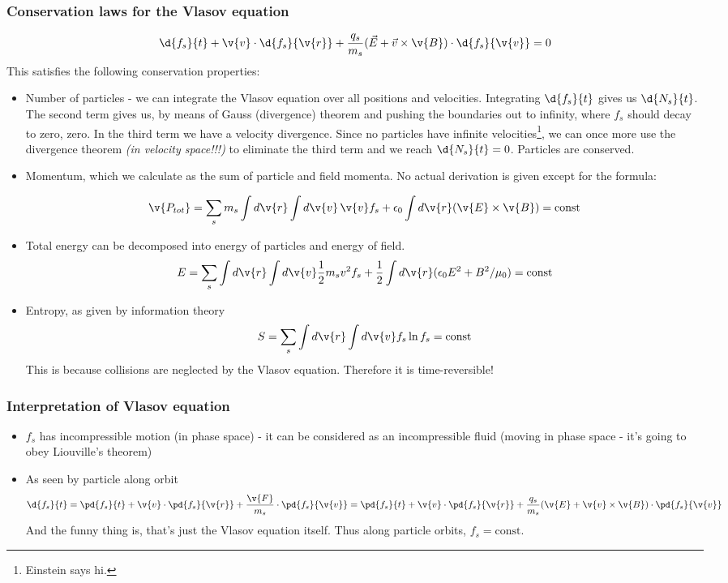 \documentclass[PlasmaNotes.tex]{subfiles}
\begin{document}
\subsubsection{Conservation laws for the Vlasov equation}
\[\d{f_s}{t} + \v{v} \cdot \d{f_s}{\v{r}} + \frac{q_s}{m_s} (\vec{E} + \vec{v} \times \v{B}) \cdot \d{f_s}{\v{v}} = 0\]
This satisfies the following conservation properties:
\begin{itemize}
\item Number of particles - we can integrate the Vlasov equation over all positions and velocities. Integrating $\d{f_s}{t}$ gives us $\d{N_s}{t}$. The second term gives us, by means of Gauss (divergence) theorem and pushing the boundaries out to infinity, where $f_s$ should decay to zero, zero. In the third term we have a velocity divergence. Since no particles have infinite velocities\footnote{Einstein says hi.}, we can once more use the divergence theorem \textit{(in velocity space!!!)} to eliminate the third term and we reach $\d{N_s}{t} = 0$. Particles are conserved.
\item Momentum, which we calculate as the sum of particle and field momenta. No actual derivation is given except for the formula:

\[ \v{P_{tot}} = \sum_s m_s \int d\v{r} \int d\v{v} \, \v{v} f_s + \epsilon_0 \int d\v{r} (\v{E} \times \v{B}) = \text{const}  \]

\item Total energy can be decomposed into energy of particles and energy of field.
\[ E= \sum_s \int d\v{r} \int d\v{v} \frac{1}{2} m_s v^2 f_s + \frac{1}{2} \int d\v{r} (\epsilon_0 E^2 + B^2/\mu_0) = \text{const} \]

\item Entropy, as given by information theory
\[ S = \sum_s \int d\v{r} \int d\v{v} f_s \ln{f_s} = \text{const} \]
This is because collisions are neglected by the Vlasov equation. Therefore it is time-reversible!
\end{itemize}


\subsubsection{Interpretation of Vlasov equation}
\begin{itemize}
\item $f_s$ has incompressible motion (in phase space) - it can be considered as an incompressible fluid (moving in phase space - it's going to obey Liouville's theorem)
\item As seen by particle along orbit \[ \d{f_s}{t} = \pd{f_s}{t} + \v{v} \cdot \pd{f_s}{\v{r}} + \frac{\v{F}}{m_s} \cdot \pd{f_s}{\v{v}} = \pd{f_s}{t} + \v{v} \cdot \pd{f_s}{\v{r}} + \frac{q_s}{m_s} (\v{E} + \v{v} \times \v{B}) \cdot \pd{f_s}{\v{v}} \]
And the funny thing is, that's just the Vlasov equation itself. Thus along particle orbits, $f_s = \text{const}$.
\end{itemize}
\end{document}
